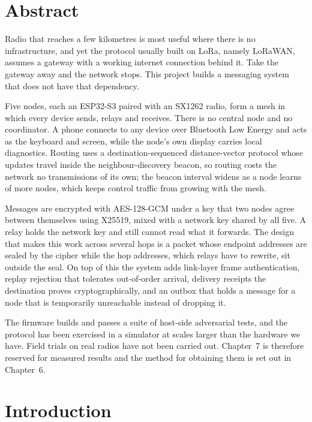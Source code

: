\documentclass[12pt,a4paper,oneside]{report}
\begin{document}
\chapter*{Abstract}

Radio that reaches a few kilometres is most useful where there is no
infrastructure, and yet the protocol usually built on LoRa, namely LoRaWAN,
assumes a gateway with a working internet connection behind it. Take the gateway
away and the network stops. This project builds a messaging system that does not
have that dependency.

Five nodes, each an ESP32-S3 paired with an SX1262 radio, form a mesh in which
every device sends, relays and receives. There is no central node and no
coordinator. A phone connects to any device over Bluetooth Low Energy and acts as
the keyboard and screen, while the node's own display carries local
diagnostics. Routing uses a
destination-sequenced distance-vector protocol whose updates travel inside the
neighbour-discovery beacon, so routing costs the network no transmissions of its
own; the beacon interval widens as a node learns of more nodes, which keeps
control traffic from growing with the mesh.

Messages are encrypted with AES-128-GCM under a key that two nodes agree between
themselves using X25519, mixed with a network key shared by all five. A relay
holds the network key and still cannot read what it forwards. The design that
makes this work across several hops is a packet whose endpoint addresses are
sealed by the cipher while the hop addresses, which relays have to rewrite, sit
outside the seal. On top of this the system adds link-layer frame authentication,
replay rejection that tolerates out-of-order arrival, delivery receipts the
destination proves cryptographically, and an outbox that holds a message for a
node that is temporarily unreachable instead of dropping it.

The firmware builds and passes a suite of host-side adversarial tests, and the
protocol has been exercised in a simulator at scales larger than the hardware we
have. Field trials on real radios have not been carried out. Chapter~7 is
therefore reserved for measured results and the method for obtaining them is set
out in Chapter~6.

\tableofcontents
\listoffigures
\listoftables

\chapter{Introduction}
\end{document}
